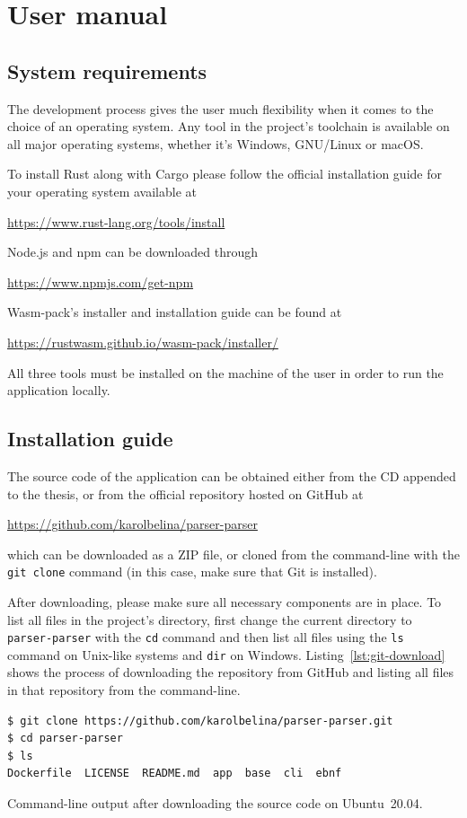 \documentclass[english,bachelors,forcepolishlogotype]{wizthesis}
\begin{document}
\chapter{User manual} \label{ch:user-manual}

\section{System requirements}

The development process gives the user much flexibility when it comes to the
choice of an operating system. Any tool in the project's toolchain is available
on all major operating systems, whether it's Windows, GNU/Linux or macOS.

To install Rust along with Cargo please follow the official installation guide
for your operating system available at
\begin{center}
  \url{https://www.rust-lang.org/tools/install}
\end{center}
Node.js and npm can be downloaded through
\begin{center}
  \url{https://www.npmjs.com/get-npm}
\end{center}
Wasm-pack's installer and installation guide can be found at
\begin{center}
  \url{https://rustwasm.github.io/wasm-pack/installer/}
\end{center}
All three tools must be installed on the machine of the user in order to run the
application locally.

\section{Installation guide}

The source code of the application can be obtained either from the CD appended
to the thesis, or from the official repository hosted on GitHub at
\begin{center}
  \url{https://github.com/karolbelina/parser-parser}
\end{center}
which can be downloaded as a ZIP file, or cloned from the command-line with
the \texttt{git clone} command (in this case, make sure that Git is installed).

After downloading, please make sure all necessary components are in place. To
list all files in the project's directory, first change the current directory to
\texttt{parser-parser} with the \texttt{cd} command and then list all files
using the \texttt{ls} command on Unix-like systems and \texttt{dir} on Windows.
Listing~\ref{lst:git-download} shows the process of downloading the repository
from GitHub and listing all files in that repository from the command-line.
\begin{listing}[H]
  \begin{verbatim}
$ git clone https://github.com/karolbelina/parser-parser.git
$ cd parser-parser
$ ls
Dockerfile  LICENSE  README.md  app  base  cli  ebnf
  \end{verbatim}
  \caption{Command-line output after downloading the source code on
  Ubuntu~20.04.}
  \label{lst:git-download}
\end{listing}
\end{document}
